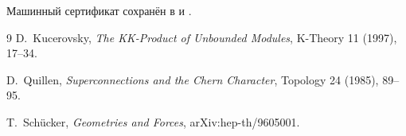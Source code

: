 Машинный сертификат сохранён в
 и
.

\begin{thebibliography}{9}
D.~Kucerovsky,
\emph{The KK-Product of Unbounded Modules},
K-Theory 11 (1997), 17--34.

D.~Quillen,
\emph{Superconnections and the Chern Character},
Topology 24 (1985), 89--95.

T.~Sch\"ucker,
\emph{Geometries and Forces},
arXiv:hep-th/9605001.
\end{thebibliography}